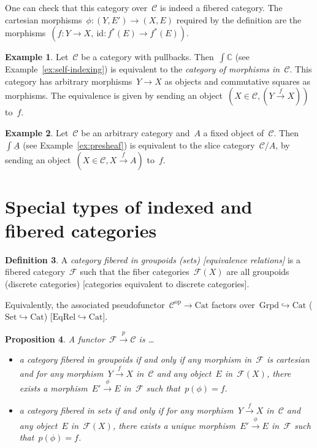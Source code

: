 \documentclass[a4paper,english,12pt]{scrartcl}
\theoremstyle{definition}
\newtheorem{defn}{Definition}[section]
\newtheorem{ex}[defn]{Example}
\theoremstyle{plain}
\newtheorem{prop}[defn]{Proposition}
\theoremstyle{remark}
\newcommand{\CC}{\mathbb{C}}
\newcommand{\C}{\mathcal{C}}
\newcommand{\F}{\mathcal{F}}
\newcommand{\id}{\mathrm{id}}
\newcommand{\op}{\mathrm{op}}
\newcommand{\xra}[1]{\xrightarrow{#1}}
\newcommand{\Set}{\mathrm{Set}}
\newcommand{\Cat}{\mathrm{Cat}}
\newcommand{\ul}[1]{\underline{#1}}
\begin{document}
One can check that this category over~$\C$ is indeed a fibered category. The
cartesian morphisms~$\phi : (Y,E') \to (X,E)$ required by the definition are
the morphisms~$(f : Y \to X,\ \id : f^*(E) \to f^*(E))$.

\begin{ex}Let~$\C$ be a category with pullbacks. Then~$\int \CC$ (see
Example~\ref{ex:self-indexing}) is equivalent to the \emph{category of morphisms
in~$\C$}. This category has arbitrary morphisms~$Y \to X$ as objects and commutative
squares as morphisms. The equivalence is given by sending an object~$(X \in \C,
(Y \xra{f} X))$ to~$f$.
\end{ex}

\begin{ex}Let~$\C$ be an arbitrary category and~$A$ a fixed object of~$\C$.
Then~$\int \ul{A}$ (see Example~\ref{ex:presheaf}) is
equivalent to the slice category~$\C/A$, by sending an object~$(X \in \C, X
\xra{f} A)$ to~$f$.
\end{ex}


\section{Special types of indexed and fibered categories}

\begin{defn}A \emph{category fibered in groupoids (sets) [equivalence relations]}
is a fibered category~$\F$ such that the fiber categories~$\F(X)$ are all
groupoids (discrete categories) [categories equivalent to discrete
categories].\end{defn}

Equivalently, the associated pseudofunctor~$\C^\op \to \Cat$ factors
over~$\mathrm{Grpd} \hookrightarrow \Cat$ ($\Set \hookrightarrow
\Cat$) [$\mathrm{EqRel} \hookrightarrow \Cat$].

\begin{prop}A functor~$\F \xra{p} \C$ is \ldots
\begin{itemize}
\item a category fibered in groupoids if and only if any morphism
in~$\F$ is cartesian and for any morphism~$Y \xra{f} X$ in~$\C$ and any
object~$E$ in~$\F(X)$, there exists a morphism~$E' \xra{\phi} E$ in~$\F$ such
that~$p(\phi) = f$.
\item a category fibered in sets if and only if
for any morphism~$Y \xra{f} X$ in~$\C$ and any
object~$E$ in~$\F(X)$, there exists a unique morphism~$E' \xra{\phi} E$ in~$\F$ such
that~$p(\phi) = f$.
\end{itemize}
\end{prop}
\end{document}
